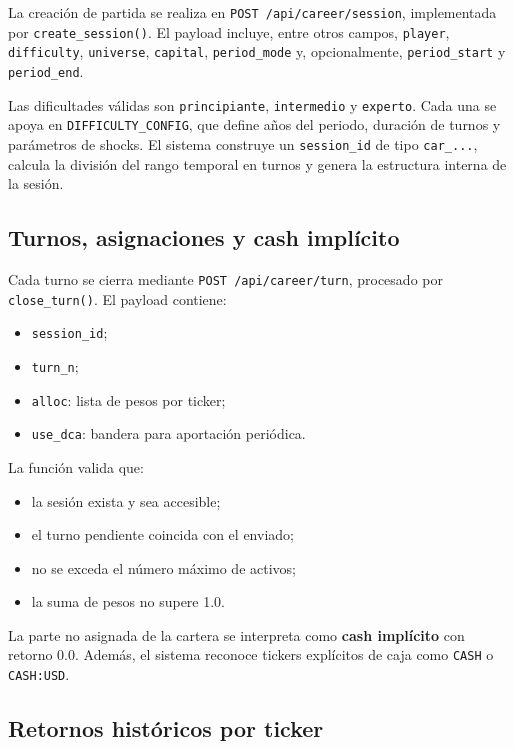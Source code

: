 La creación de partida se realiza en \texttt{POST /api/career/session}, implementada por \texttt{create\_session()}. El payload incluye, entre otros campos, \texttt{player}, \texttt{difficulty}, \texttt{universe}, \texttt{capital}, \texttt{period\_mode} y, opcionalmente, \texttt{period\_start} y \texttt{period\_end}.

Las dificultades válidas son \texttt{principiante}, \texttt{intermedio} y \texttt{experto}. Cada una se apoya en \texttt{DIFFICULTY\_CONFIG}, que define años del periodo, duración de turnos y parámetros de shocks. El sistema construye un \texttt{session\_id} de tipo \texttt{car\_...}, calcula la división del rango temporal en turnos y genera la estructura interna de la sesión.

\subsection{Turnos, asignaciones y cash implícito}

Cada turno se cierra mediante \texttt{POST /api/career/turn}, procesado por \texttt{close\_turn()}. El payload contiene:

\begin{itemize}
    \item \texttt{session\_id};
    \item \texttt{turn\_n};
    \item \texttt{alloc}: lista de pesos por ticker;
    \item \texttt{use\_dca}: bandera para aportación periódica.
\end{itemize}

La función valida que:

\begin{itemize}
    \item la sesión exista y sea accesible;
    \item el turno pendiente coincida con el enviado;
    \item no se exceda el número máximo de activos;
    \item la suma de pesos no supere 1.0.
\end{itemize}

La parte no asignada de la cartera se interpreta como \textbf{cash implícito} con retorno 0.0. Además, el sistema reconoce tickers explícitos de caja como \texttt{CASH} o \texttt{CASH:USD}.

\subsection{Retornos históricos por ticker}

